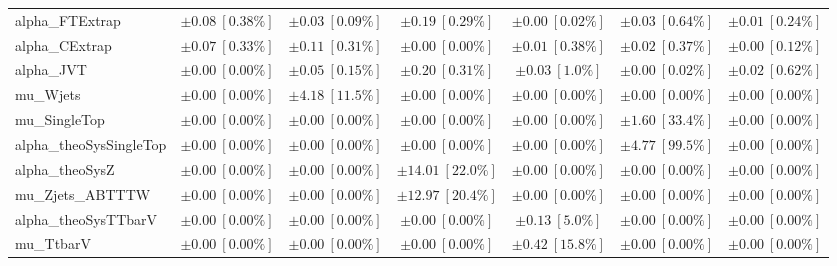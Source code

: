 \begin{sidewaystable}
\begin{center}
\begin{tabular*}{\textwidth}{@{\extracolsep{\fill}}lcccccc}
alpha\_FTExtrap         & $\pm 0.08\ [0.38\%] $          & $\pm 0.03\ [0.09\%] $          & $\pm 0.19\ [0.29\%] $          & $\pm 0.00\ [0.02\%] $          & $\pm 0.03\ [0.64\%] $          & $\pm 0.01\ [0.24\%] $       \\
alpha\_CExtrap         & $\pm 0.07\ [0.33\%] $          & $\pm 0.11\ [0.31\%] $          & $\pm 0.00\ [0.00\%] $          & $\pm 0.01\ [0.38\%] $          & $\pm 0.02\ [0.37\%] $          & $\pm 0.00\ [0.12\%] $       \\
alpha\_JVT         & $\pm 0.00\ [0.00\%] $          & $\pm 0.05\ [0.15\%] $          & $\pm 0.20\ [0.31\%] $          & $\pm 0.03\ [1.0\%] $          & $\pm 0.00\ [0.02\%] $          & $\pm 0.02\ [0.62\%] $       \\
mu\_Wjets         & $\pm 0.00\ [0.00\%] $          & $\pm 4.18\ [11.5\%] $          & $\pm 0.00\ [0.00\%] $          & $\pm 0.00\ [0.00\%] $          & $\pm 0.00\ [0.00\%] $          & $\pm 0.00\ [0.00\%] $       \\
mu\_SingleTop         & $\pm 0.00\ [0.00\%] $          & $\pm 0.00\ [0.00\%] $          & $\pm 0.00\ [0.00\%] $          & $\pm 0.00\ [0.00\%] $          & $\pm 1.60\ [33.4\%] $          & $\pm 0.00\ [0.00\%] $       \\
alpha\_theoSysSingleTop         & $\pm 0.00\ [0.00\%] $          & $\pm 0.00\ [0.00\%] $          & $\pm 0.00\ [0.00\%] $          & $\pm 0.00\ [0.00\%] $          & $\pm 4.77\ [99.5\%] $          & $\pm 0.00\ [0.00\%] $       \\
alpha\_theoSysZ         & $\pm 0.00\ [0.00\%] $          & $\pm 0.00\ [0.00\%] $          & $\pm 14.01\ [22.0\%] $          & $\pm 0.00\ [0.00\%] $          & $\pm 0.00\ [0.00\%] $          & $\pm 0.00\ [0.00\%] $       \\
mu\_Zjets\_ABTTTW         & $\pm 0.00\ [0.00\%] $          & $\pm 0.00\ [0.00\%] $          & $\pm 12.97\ [20.4\%] $          & $\pm 0.00\ [0.00\%] $          & $\pm 0.00\ [0.00\%] $          & $\pm 0.00\ [0.00\%] $       \\
alpha\_theoSysTTbarV         & $\pm 0.00\ [0.00\%] $          & $\pm 0.00\ [0.00\%] $          & $\pm 0.00\ [0.00\%] $          & $\pm 0.13\ [5.0\%] $          & $\pm 0.00\ [0.00\%] $          & $\pm 0.00\ [0.00\%] $       \\
mu\_TtbarV         & $\pm 0.00\ [0.00\%] $          & $\pm 0.00\ [0.00\%] $          & $\pm 0.00\ [0.00\%] $          & $\pm 0.42\ [15.8\%] $          & $\pm 0.00\ [0.00\%] $          & $\pm 0.00\ [0.00\%] $       \\

\end{tabular*}
\end{center}
\end{sidewaystable}
